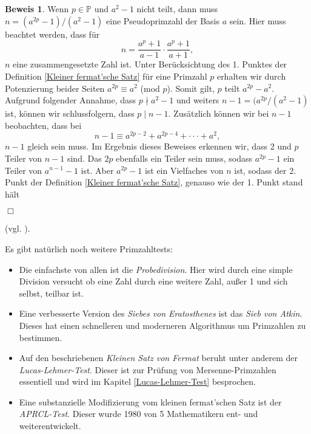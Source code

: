 \documentclass[12pt,a4paper]{article}
\theoremstyle{definition}
\newtheorem{beweis}{Beweis}[subsection]
\begin{document}
\begin{beweis}
Wenn $p \in \mathbb{P}$ und $a^2-1$ nicht teilt, dann muss $n = (a^{2p}-1)/(a^2-1)$ eine Pseudoprimzahl der Basis $a$ sein.
Hier muss beachtet werden, dass für
\[n = \frac {a^p + 1} {a - 1} \cdot \frac {a^p + 1} {a + 1},\]
$n$ eine zusammengesetzte Zahl ist.
Unter Berücksichtung des 1. Punktes der Definition \ref{Kleiner fermat'sche Satz} für eine Primzahl $p$ erhalten wir durch Potenzierung beider Seiten %
$a^{2p} \equiv a^2$ (mod $p$).
Somit gilt, $p$ teilt $a^{2p} - a^2$.
Aufgrund folgender Annahme, dass $p \nmid a^2 - 1$ und weiters $n - 1 = (a^{2p} / (a^2 - 1)$ ist, können wir schlussfolgern, dass $p \mid n - 1$.
Zusätzlich können wir bei $n - 1$ beobachten, dass bei
\[n - 1 \equiv a^{2p-2} + a^{2p-4} + \cdot\cdot\cdot + a^2,\]
$n - 1$ gleich sein muss.
Im Ergebnis dieses Beweises erkennen wir, dass 2 und $p$ Teiler von $n - 1$ sind.
Das $2p$ ebenfalls ein Teiler sein muss, sodass $a^{2p} - 1$ ein Teiler von $a^{n-1} - 1$ ist.
Aber $a^{2p} - 1$ ist ein Vielfaches von $n$ ist, sodass der 2. Punkt der Definition \ref{Kleiner fermat'sche Satz}, genauso wie der 1. Punkt stand hält
\begin{flushright}
$\Box$
\end{flushright}
\end{beweis}
(vgl. \cite[131--133]{Crandall2005}).

Es gibt natürlich noch weitere Primzahltests:
\begin{itemize}
    \item Die einfachste von allen ist die \textit{Probedivision}.
    Hier wird durch eine simple Division versucht ob eine Zahl durch eine weitere Zahl, außer 1 und sich selbst, teilbar ist.
    \item Eine verbesserte Version des \textit{Siebes von Eratosthenes} ist das \textit{Sieb von Atkin}.
    Dieses hat einen schnelleren und moderneren Algorithmus um Primzahlen zu bestimmen.
    \item Auf den beschriebenen \textit{Kleinen Satz von Fermat} beruht unter anderem der \textit{Lucas-Lehmer-Test}.
    Dieser ist zur Prüfung von Mersenne-Primzahlen essentiell und wird im Kapitel \ref{Lucas-Lehmer-Test} besprochen.
    \item Eine substanzielle Modifizierung vom kleinen fermat'schen Satz ist der \textit{APRCL-Test}.
    Dieser wurde 1980 von 5 Mathematikern ent- und weiterentwickelt.
\end{itemize}
\end{document}
